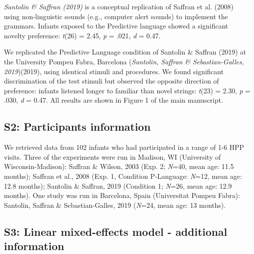 \begin{appendix}
\emph{Santolin \& Saffran (2019)} is a conceptual replication of Saffran
et al. (2008) using non-linguistic sounds (e.g., computer alert sounds)
to implement the grammars. Infants exposed to the Predictive language
showed a significant novelty preference: \emph{t}(26) = 2.45, \emph{p} =
.021, \emph{d} = 0.47.

We replicated the Predictive Language condition of Santolin \& Saffran
(2019) at the University Pompeu Fabra, Barcelona (\emph{Santolin,
Saffran \& Sebastian-Galles, 2019})(2019), using identical stimuli and
procedures. We found significant discrimination of the test stimuli but
observed the opposite direction of preference: infants listened longer
to familiar than novel strings: \emph{t}(23) = 2.30, \emph{p} = .030,
\emph{d} = 0.47. All results are shown in Figure 1 of the main
manuscript.

\hypertarget{s2-participants-information}{%
\subsection{S2: Participants
information}\label{s2-participants-information}}

We retrieved data from 102 infants who had participated in a range of
1-6 HPP visits. Three of the experiments were run in Madison, WI
(University of Wisconsin-Madison): Saffran \& Wilson, 2003 (Exp. 2;
\emph{N}=40, mean age: 11.5 months); Saffran et al., 2008 (Exp. 1,
Condition P-Language: \emph{N}=12, mean age: 12.8 months); Santolin \&
Saffran, 2019 (Condition 1; \emph{N}=26, mean age: 12.9 months). One
study was run in Barcelona, Spain (Universitat Pompeu Fabra): Santolin,
Saffran \& Sebastian-Galles, 2019 (\emph{N}=24, mean age: 13 months).

\hypertarget{s3-linear-mixed-effects-model---additional-information}{%
\subsection{S3: Linear mixed-effects model - additional
information}\label{s3-linear-mixed-effects-model---additional-information}}


\end{appendix}

